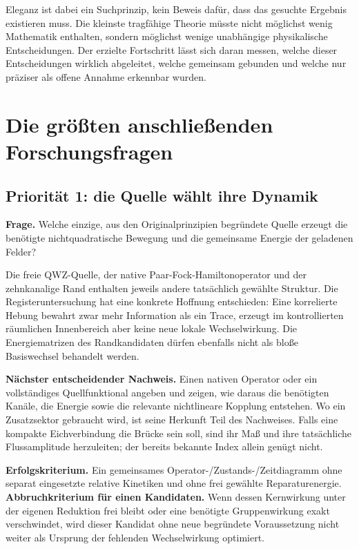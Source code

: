\documentclass[11pt,a4paper,oneside,parskip=half,headings=normal,numbers=noenddot,bibliography=totoc]{scrreprt}
\begin{document}
Eleganz ist dabei ein Suchprinzip, kein Beweis dafür, dass das gesuchte Ergebnis existieren muss. Die kleinste tragfähige Theorie müsste nicht möglichst wenig Mathematik enthalten, sondern möglichst wenige unabhängige physikalische Entscheidungen. Der erzielte Fortschritt lässt sich daran messen, welche dieser Entscheidungen wirklich abgeleitet, welche gemeinsam gebunden und welche nur präziser als offene Annahme erkennbar wurden.

\chapter{Die größten anschließenden Forschungsfragen}
\section{Priorität 1: die Quelle wählt ihre Dynamik}
\textbf{Frage.} Welche einzige, aus den Originalprinzipien begründete Quelle erzeugt die benötigte nichtquadratische Bewegung und die gemeinsame Energie der geladenen Felder?

Die freie QWZ-Quelle, der native Paar-Fock-Hamiltonoperator und der zehnkanalige Rand enthalten jeweils andere tatsächlich gewählte Struktur. Die Registeruntersuchung hat eine konkrete Hoffnung entschieden: Eine korrelierte Hebung bewahrt zwar mehr Information als ein Trace, erzeugt im kontrollierten räumlichen Innenbereich aber keine neue lokale Wechselwirkung. Die Energiematrizen des Randkandidaten dürfen ebenfalls nicht als bloße Basiswechsel behandelt werden.

\textbf{Nächster entscheidender Nachweis.} Einen nativen Operator oder ein vollständiges Quellfunktional angeben und zeigen, wie daraus die benötigten Kanäle, die Energie sowie die relevante nichtlineare Kopplung entstehen. Wo ein Zusatzsektor gebraucht wird, ist seine Herkunft Teil des Nachweises. Falls eine kompakte Eichverbindung die Brücke sein soll, sind ihr Maß und ihre tatsächliche Flussamplitude herzuleiten; der bereits bekannte Index allein genügt nicht.

\textbf{Erfolgskriterium.} Ein gemeinsames Operator-/Zustands-/Zeitdiagramm ohne separat eingesetzte relative Kinetiken und ohne frei gewählte Reparaturenergie. \textbf{Abbruchkriterium für einen Kandidaten.} Wenn dessen Kernwirkung unter der eigenen Reduktion frei bleibt oder eine benötigte Gruppenwirkung exakt verschwindet, wird dieser Kandidat ohne neue begründete Voraussetzung nicht weiter als Ursprung der fehlenden Wechselwirkung optimiert.
\end{document}
